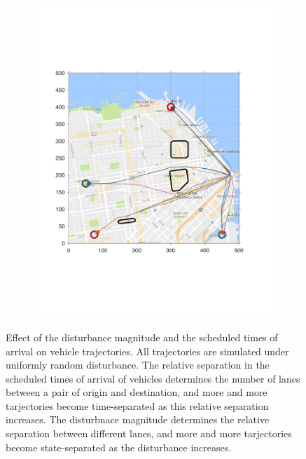 \begin{figure}[!htb]
\begin{subfigure}{\columnwidth}
  \includegraphics[width=\columnwidth]{figs/sf_d11sep5}
  \label{fig:sf_d11sep5}
\end{subfigure}%
\caption{Effect of the disturbance magnitude and the scheduled times of arrival on vehicle trajectories. All trajectories are simulated under uniformly random disturbance. The relative separation in the scheduled times of arrival of vehicles determines the number of lanes between a pair of origin and destination, and more and more tarjectories become time-separated as this relative separation increases. The disturbnace magnitude determines the relative separation between different lanes, and more and more tarjectories become state-separated as the disturbance increases. }
\label{fig:trajectories_sf}
\end{figure}

